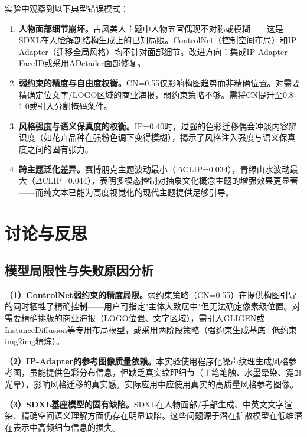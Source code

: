 \documentclass[12pt,a4paper]{ctexart}
\begin{document}
实验中观察到以下典型错误模式：

\begin{enumerate}[itemsep=2pt,topsep=4pt]
    \item \textbf{人物面部细节崩坏。}古风美人主题中人物五官偶现不对称或模糊——这是SDXL在人脸解剖结构生成上的已知局限。ControlNet（控制空间布局）和IP-Adapter（迁移全局风格）均不针对面部细节。改进方向：集成IP-Adapter-FaceID或采用ADetailer面部修复。
    \item \textbf{弱约束的精度与自由度权衡。}CN=0.55仅影响构图趋势而非精确位置。对需要精确定位文字/LOGO区域的商业海报，弱约束策略不够。需将CN提升至0.8--1.0或引入分割掩码条件。
    \item \textbf{风格强度与语义保真度的权衡。}IP=0.40时，过强的色彩迁移偶会冲淡内容辨识度（如花卉品种在强粉色调下变得模糊），揭示了风格注入强度与语义保真度之间的固有张力。
    \item \textbf{跨主题泛化差异。}赛博朋克主题波动最小（$\Delta$CLIP=0.034），青绿山水波动最大（$\Delta$CLIP=0.044），表明多模态控制对抽象文化概念主题的增强效果更显著——而纯文本已能为高度视觉化的现代主题提供足够引导。
\end{enumerate}

\section{讨论与反思}
\label{sec:discussion}

\subsection{模型局限性与失败原因分析}

\textbf{（1）ControlNet弱约束的精度局限。}弱约束策略（CN=0.55）在提供构图引导的同时牺牲了精确控制——用户可指定"主体大致居中"但无法确定像素级位置。对需要精确排版的商业海报（LOGO位置、文字区域），需引入GLIGEN或InstanceDiffusion等专用布局模型，或采用两阶段策略（强约束生成基底+低约束img2img精炼）。

\textbf{（2）IP-Adapter的参考图像质量依赖。}本实验使用程序化噪声纹理生成风格参考图，虽能提供色彩分布信息，但缺乏真实纹理细节（工笔笔触、水墨晕染、霓虹光晕），影响风格迁移的真实感。实际应用中应使用真实的高质量风格参考图像。

\textbf{（3）SDXL基座模型的固有缺陷。}SDXL在人物面部/手部生成、中英文文字渲染、精确空间语义理解方面仍存在明显缺陷。这些问题源于潜在扩散模型在低维潜在表示中高频细节信息的损失。
\end{document}
